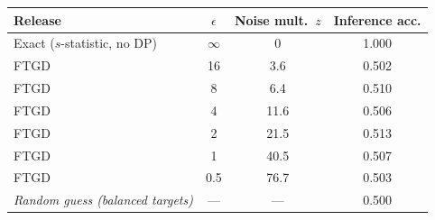 \begin{tabular}{lccc}
\toprule
Release & $\epsilon$ & Noise mult.\ $z$ & Inference acc. \\
\midrule
Exact ($s$-statistic, no DP) & $\infty$ & 0 & 1.000 \\
FTGD & 16 & 3.6 & 0.502 \\
FTGD & 8 & 6.4 & 0.510 \\
FTGD & 4 & 11.6 & 0.506 \\
FTGD & 2 & 21.5 & 0.513 \\
FTGD & 1 & 40.5 & 0.507 \\
FTGD & 0.5 & 76.7 & 0.503 \\
\midrule
\emph{Random guess (balanced targets)} & --- & --- & 0.500 \\
\bottomrule
\end{tabular}